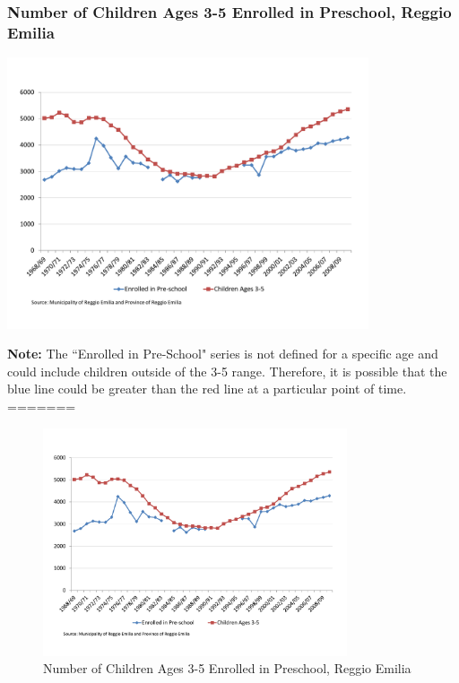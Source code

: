 \documentclass[static]{JJH-Beamer_PAGENOS}
\begin{document}
\begin{frame}
\frametitle{Number of Children Ages 3-5 Enrolled in Preschool, Reggio Emilia}
\begin{center}
\includegraphics[width=0.8\textwidth]{../../output/image/Enrollement_Preschool_RE.pdf}
\end{center}
\tiny{\textbf{Note:} The ``Enrolled in Pre-School" series is not defined for a specific age and could include children outside of the 3-5 range. Therefore, it is possible that the blue line could be greater than the red line at a particular point of time.}
=======
\centering
\begin{figure}[H]
\caption{Number of Children Ages 3-5 Enrolled in Preschool, Reggio Emilia}
\includegraphics[width=0.8\textwidth]{../../output/image/Enrollement_Preschool_RE.pdf}
\end{figure}
\end{frame}
\end{document}
